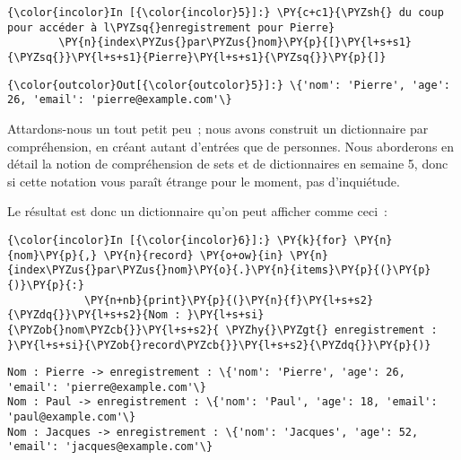     \begin{Verbatim}[commandchars=\\\{\},frame=single,framerule=0.3mm,rulecolor=\color{cellframecolor}]
{\color{incolor}In [{\color{incolor}5}]:} \PY{c+c1}{\PYZsh{} du coup pour accéder à l\PYZsq{}enregistrement pour Pierre}
        \PY{n}{index\PYZus{}par\PYZus{}nom}\PY{p}{[}\PY{l+s+s1}{\PYZsq{}}\PY{l+s+s1}{Pierre}\PY{l+s+s1}{\PYZsq{}}\PY{p}{]}
\end{Verbatim}


\begin{Verbatim}[commandchars=\\\{\},frame=single,framerule=0.3mm,rulecolor=\color{cellframecolor}]
{\color{outcolor}Out[{\color{outcolor}5}]:} \{'nom': 'Pierre', 'age': 26, 'email': 'pierre@example.com'\}
\end{Verbatim}
            
    Attardons-nous un tout petit peu~; nous avons construit un dictionnaire
par compréhension, en créant autant d'entrées que de personnes. Nous
aborderons en détail la notion de compréhension de sets et de
dictionnaires en semaine 5, donc si cette notation vous paraît étrange
pour le moment, pas d'inquiétude.

Le résultat est donc un dictionnaire qu'on peut afficher comme ceci~:

    \begin{Verbatim}[commandchars=\\\{\},frame=single,framerule=0.3mm,rulecolor=\color{cellframecolor}]
{\color{incolor}In [{\color{incolor}6}]:} \PY{k}{for} \PY{n}{nom}\PY{p}{,} \PY{n}{record} \PY{o+ow}{in} \PY{n}{index\PYZus{}par\PYZus{}nom}\PY{o}{.}\PY{n}{items}\PY{p}{(}\PY{p}{)}\PY{p}{:}
            \PY{n+nb}{print}\PY{p}{(}\PY{n}{f}\PY{l+s+s2}{\PYZdq{}}\PY{l+s+s2}{Nom : }\PY{l+s+si}{\PYZob{}nom\PYZcb{}}\PY{l+s+s2}{ \PYZhy{}\PYZgt{} enregistrement : }\PY{l+s+si}{\PYZob{}record\PYZcb{}}\PY{l+s+s2}{\PYZdq{}}\PY{p}{)}
\end{Verbatim}


    \begin{Verbatim}[commandchars=\\\{\},frame=single,framerule=0.3mm,rulecolor=\color{cellframecolor}]
Nom : Pierre -> enregistrement : \{'nom': 'Pierre', 'age': 26, 'email': 'pierre@example.com'\}
Nom : Paul -> enregistrement : \{'nom': 'Paul', 'age': 18, 'email': 'paul@example.com'\}
Nom : Jacques -> enregistrement : \{'nom': 'Jacques', 'age': 52, 'email': 'jacques@example.com'\}
\end{Verbatim}

